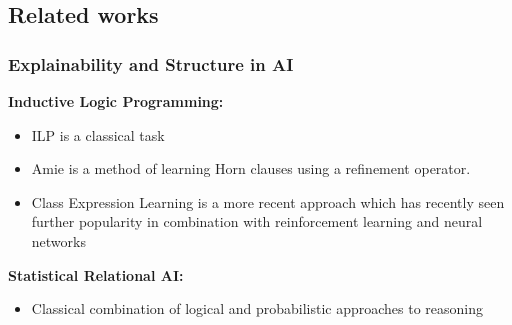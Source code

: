

%
%

\subsection{Related works}

\subsubsection{Explainability and Structure in AI}

\textbf{Inductive Logic Programming:}
\begin{itemize}
    \item ILP is a classical task \cite{muggleton_inductive_1994}
    \item Amie \cite{galarraga_amie_2013} is a method of learning Horn clauses using a refinement operator.
    \item Class Expression Learning \cite{lehmann_class_2011} is a more recent approach which has recently seen further popularity in combination with reinforcement learning \cite{demir_drill-_2021} and neural networks \cite{kouagou_neural_2022, pesquita_neural_2023}
\end{itemize}

\textbf{Statistical Relational AI:} \cite{getoor_introduction_2019}
\begin{itemize}
    \item Classical combination of logical and probabilistic approaches to reasoning
\end{itemize}

